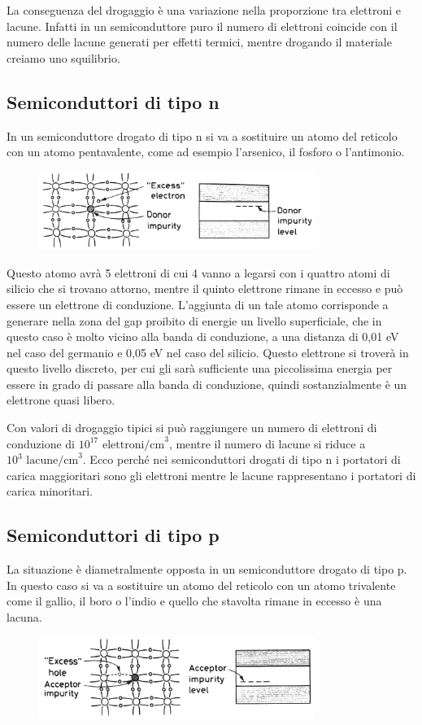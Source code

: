 La conseguenza del drogaggio è una variazione nella proporzione tra elettroni e lacune. Infatti in un semiconduttore puro il numero di elettroni coincide con il numero delle lacune generati per effetti termici, mentre drogando il materiale creiamo uno squilibrio.

\subsection{Semiconduttori di tipo n}
In un semiconduttore drogato di tipo n si va a sostituire un atomo del reticolo con un atomo pentavalente, come ad esempio l'arsenico, il fosforo o l'antimonio.
\begin{figure}[H]
   \centering
   \includegraphics[width=0.8\textwidth]{immagini/semiconduttori_drogati_tipo_n.png}
\end{figure}
Questo atomo avrà 5 elettroni di cui 4 vanno a legarsi con i quattro atomi di silicio che si trovano attorno, mentre il quinto elettrone rimane in eccesso e può essere un elettrone di conduzione. L'aggiunta di un tale atomo corrisponde a generare nella zona del gap proibito di energie un livello superficiale, che in questo caso è molto vicino alla banda di conduzione, a una distanza di 0,01 eV nel caso del germanio e 0,05 eV nel caso del silicio. Questo elettrone si troverà in questo livello discreto, per cui gli sarà sufficiente una piccolissima energia per essere in grado di passare alla banda di conduzione, quindi sostanzialmente è un elettrone quasi libero.

Con valori di drogaggio tipici si può raggiungere un numero di elettroni di conduzione di $10^{17}\text{ elettroni/cm}^3$, mentre il numero di lacune si riduce a $10^3\text{ lacune/cm}^3$. Ecco perché nei semiconduttori drogati di tipo n i portatori di carica maggioritari sono gli elettroni mentre le lacune rappresentano i portatori di carica minoritari.
\subsection{Semiconduttori di tipo p}
La situazione è diametralmente opposta in un semiconduttore drogato di tipo p. In questo caso si va a sostituire un atomo del reticolo con un atomo trivalente come il gallio, il boro o l'indio e quello che stavolta rimane in eccesso è una lacuna.
\begin{figure}[H]
   \centering
   \includegraphics[width=0.8\textwidth]{immagini/semiconduttori_drogati_tipo_p.png}
\end{figure}

